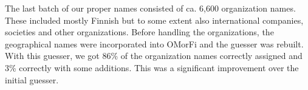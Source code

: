 \documentclass{llncs}
\begin{document}
The last batch of our proper names consisted of ca. 6,600
organization names. These included mostly Finnish but to some extent
also international companies, societies and other
organizations. Before handling the organizations, the geographical
names were incorporated into OMorFi and the guesser was rebuilt. With this
guesser, we got 86\% of the organization names correctly assigned 
and 3\% correctly with some additions. This was a significant improvement over the 
initial guesser.

% 
% 
\end{document}

